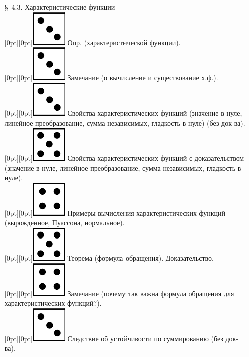 \documentclass[10pt]{amsart}
\begin{document}
\begin{enumerate}
\begin{enumerate}
\item[\S\, 4.3.] Характеристические функции \\
 \raisebox{-1pt}[0pt][0pt]{\includegraphics[width=0.02\linewidth]{3.png}} Опр. (характеристической функции). \\
 \raisebox{-1pt}[0pt][0pt]{\includegraphics[width=0.02\linewidth]{3.png}} Замечание (о вычисление и существование х.ф.). \\
 \raisebox{-1pt}[0pt][0pt]{\includegraphics[width=0.02\linewidth]{3.png}} Свойства характеристических функций (значение в нуле, линейное преобразование, сумма независимых, гладкость в нуле) (без док-ва). \\
 \raisebox{-1pt}[0pt][0pt]{\includegraphics[width=0.02\linewidth]{5.png}} Свойства характеристических функций с доказательством (значение в нуле, линейное преобразование, сумма независимых, гладкость в нуле). \\
 \raisebox{-1pt}[0pt][0pt]{\includegraphics[width=0.02\linewidth]{4.png}} Примеры вычисления характеристических функций (вырожденное, Пуассона, нормальное). \\
 \raisebox{-1pt}[0pt][0pt]{\includegraphics[width=0.02\linewidth]{5.png}} Теорема (формула обращения). Доказательство. \\
 \raisebox{-1pt}[0pt][0pt]{\includegraphics[width=0.02\linewidth]{4.png}} Замечание (почему так важна формула обращения для характеристических функций?). \\
 \raisebox{-1pt}[0pt][0pt]{\includegraphics[width=0.02\linewidth]{3.png}} Следствие об устойчивости по суммированию (без док-ва). \\

\end{enumerate}
\end{enumerate}
\end{document}
